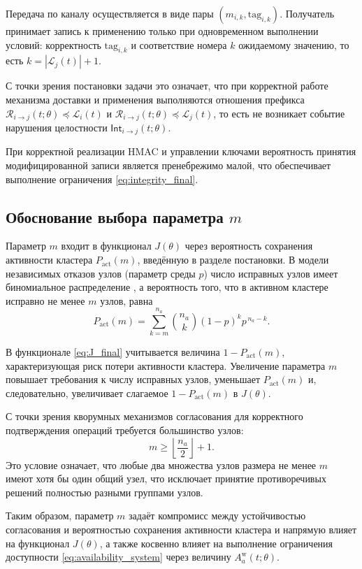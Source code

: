 Передача по каналу осуществляется в виде пары $(m_{i,k},\mathrm{tag}_{i,k})$.
Получатель принимает запись к применению только при одновременном выполнении условий:
корректность $\mathrm{tag}_{i,k}$ и
соответствие номера $k$ ожидаемому значению, то есть $k = |\mathcal{L}_j(t)| + 1$.

С точки зрения постановки задачи это означает,
что при корректной работе механизма доставки и применения
выполняются отношения префикса
$\mathcal{R}_{i\to j}(t;\theta) \preceq \mathcal{L}_i(t)$ и
$\mathcal{R}_{i\to j}(t;\theta) \preceq \mathcal{L}_j(t)$,
то есть не возникает событие нарушения целостности $\mathsf{Int}_{i\to j}(t;\theta)$.

При корректной реализации HMAC и управлении ключами вероятность принятия
модифицированной записи является пренебрежимо малой,
что обеспечивает выполнение ограничения \eqref{eq:integrity_final}.

\subsection{Обоснование выбора параметра $m$}

Параметр $m$ входит в функционал $J(\theta)$ через вероятность сохранения
активности кластера $P_{\mathrm{act}}(m)$, введённую в разделе постановки.
В модели независимых отказов узлов (параметр среды $p$)
число исправных узлов имеет биномиальное распределение \cite{Kremer2008},
а вероятность того, что в активном кластере исправно не менее $m$ узлов, равна
\[
P_{\mathrm{act}}(m)
=
\sum_{k=m}^{n_a}
\binom{n_a}{k}
(1-p)^k p^{\,n_a-k}.
\]

В функционале \eqref{eq:J_final} учитывается величина $1-P_{\mathrm{act}}(m)$,
характеризующая риск потери активности кластера.
Увеличение параметра $m$ повышает требования к числу исправных узлов,
уменьшает $P_{\mathrm{act}}(m)$ и, следовательно, увеличивает слагаемое
$1-P_{\mathrm{act}}(m)$ в $J(\theta)$.

С точки зрения кворумных механизмов согласования
для корректного подтверждения операций требуется большинство узлов:
\[
m \ge \left\lfloor \frac{n_a}{2} \right\rfloor + 1.
\]
Это условие означает, что любые два множества узлов размера не менее $m$
имеют хотя бы один общий узел, что исключает принятие противоречивых решений
полностью разными группами узлов.

Таким образом, параметр $m$ задаёт компромисс между устойчивостью согласования
и вероятностью сохранения активности кластера и напрямую влияет на функционал $J(\theta)$,
а также косвенно влияет на выполнение ограничения доступности
\eqref{eq:availability_system} через величину $A_a^{\mathrm{w}}(t;\theta)$.

